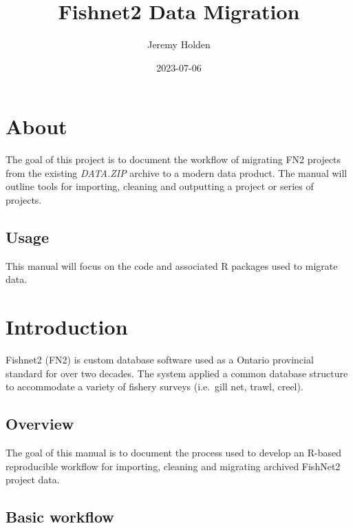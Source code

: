 \documentclass[
]{book}
\title{Fishnet2 Data Migration}
\author{Jeremy Holden}
\date{2023-07-06}
\begin{document}
\maketitle

{
\setcounter{tocdepth}{1}
\tableofcontents
}
\hypertarget{about}{%
\chapter{About}\label{about}}

The goal of this project is to document the workflow of migrating FN2 projects from the existing \emph{DATA.ZIP} archive to a modern data product. The manual will outline tools for importing, cleaning and outputting a project or series of projects.

\hypertarget{usage}{%
\section{Usage}\label{usage}}

This manual will focus on the code and associated R packages used to migrate data.

\hypertarget{introduction}{%
\chapter{Introduction}\label{introduction}}

Fishnet2 (FN2) is custom database software used as a Ontario provincial standard for over two decades. The system applied a common database structure to accommodate a variety of fishery surveys (i.e.~gill net, trawl, creel).

\hypertarget{overview}{%
\section{Overview}\label{overview}}

The goal of this manual is to document the process used to develop an R-based reproducible workflow for importing, cleaning and migrating archived FishNet2 project data.

\hypertarget{basic-workflow}{%
\section{Basic workflow}\label{basic-workflow}}
\end{document}
